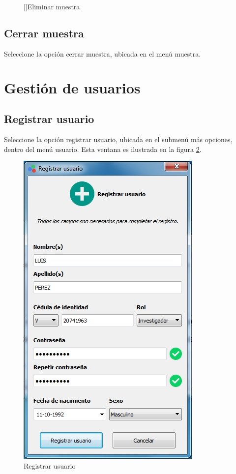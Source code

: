 \begin{figure}[H]
\begin{minipage}{.5\textwidth}
  []{Eliminar muestra}
  \label{fig:eliminar-muestra}
\end{minipage}
\end{figure}

	\subsection*{Cerrar muestra}
	
	Seleccione la opci\'{o}n cerrar muestra, ubicada en el men\'{u} muestra.

\newpage

\section*{Gesti\'{o}n de usuarios}

	\subsection*{Registrar usuario}
	
	Seleccione la opci\'{o}n registrar usuario, ubicada en el submen\'{u} m\'{a}s opciones, dentro del men\'{u} usuario. Esta ventana es ilustrada en la figura \ref{fig:registrar-usuario}.
	
\begin{figure}[H]
  \centering
  \includegraphics[width=.6\linewidth]{./img/registrar-usuario.jpg}
\caption[]{Registrar usuario\label{fig:registrar-usuario}}
\end{figure}
	
